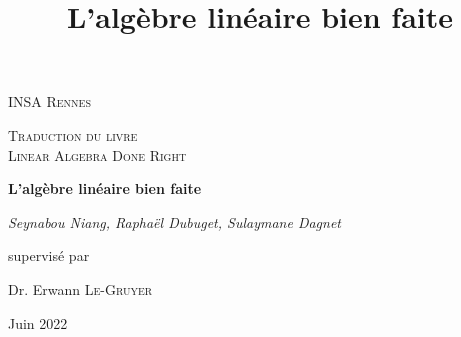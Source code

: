 \documentclass[12pt]{book}
\title{L'algèbre linéaire bien faite}
\begin{document}
\begin{titlepage}
	\centering
\par\vspace{1cm}
	{\scshape INSA Rennes \par}
	\vspace{1cm}
	{\scshape\Large Traduction du livre\\ Linear Algebra Done Right\par}
	\vspace{1.5cm}
	{\huge\bfseries L'algèbre linéaire bien faite\par}
	\vspace{2cm}
	{\Large\itshape Seynabou Niang, Raphaël Dubuget, Sulaymane Dagnet\par}
	\vfill
	supervisé par\par
	Dr. Erwann \textsc{Le-Gruyer}

	\vfill
	{\large Juin 2022\par}

\end{titlepage}


\pagebreak

\tableofcontents

\newpage



\newpage

\newpage

\newpage

\newpage

\newpage


\newpage

\newpage

\newpage

\end{document}
